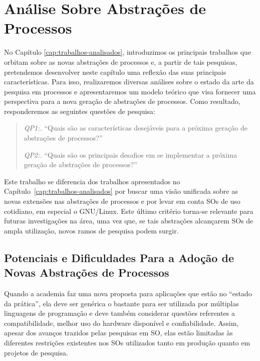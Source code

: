 \chapter{Análise Sobre Abstrações de Processos}
\label{cap:analise-sobre-abstracoes-de-processos}

No Capítulo \ref{cap:trabalhos-analisados}, introduzimos os principais trabalhos
que orbitam sobre as novas abstrações de processos e, a partir de tais
pesquisas, pretendemos desenvolver neste capítulo uma reflexão das suas principais
características. Para isso, realizaremos diversas análises sobre o estado da arte
da pesquisa em processos e apresentaremos um modelo teórico que visa fornecer
uma perspectiva para a nova geração de abstrações de processos. Como resultado,
responderemos as seguintes questões de pesquisa:

\begin{quote}
 \item \textit{QP1:.} ``Quais são as características desejáveis para a próxima geração de abstrações de processos?''
 \item \textit{QP2:.} ``Quais são os principais desafios em se implementar a próxima geração de abstrações de processos?''
\end{quote}

Este trabalho se diferencia dos trabalhos apresentados no
Capítulo~\ref{cap:trabalhos-analisados} por buscar uma visão unificada sobre as
novas extensões nas abstrações de processos e por levar em conta SOs de uso
cotidiano, em especial o GNU/Linux. Este último critério torna-se relevante
para futuras investigações na área, uma vez que, se tais abstrações alcançarem
SOs de ampla utilização, novos ramos de pesquisa podem surgir.

\section{Potenciais e Dificuldades Para a Adoção de Novas Abstrações de Processos}
\label{sec:potenciais}
Quando a academia faz uma nova proposta para aplicações que estão no ``estado da
prática'', ela deve ser genérica o bastante para ser utilizada por
múltiplas linguagens de programação e deve também considerar questões
referentes a compatibilidade, melhor uso do hardware disponível e
confiabilidade. Assim, apesar dos avanços trazidos pelas pesquisas em SO, elas
estão limitadas às diferentes restrições existentes nos SOs utilizados tanto em
produção quanto em projetos de pesquisa.

